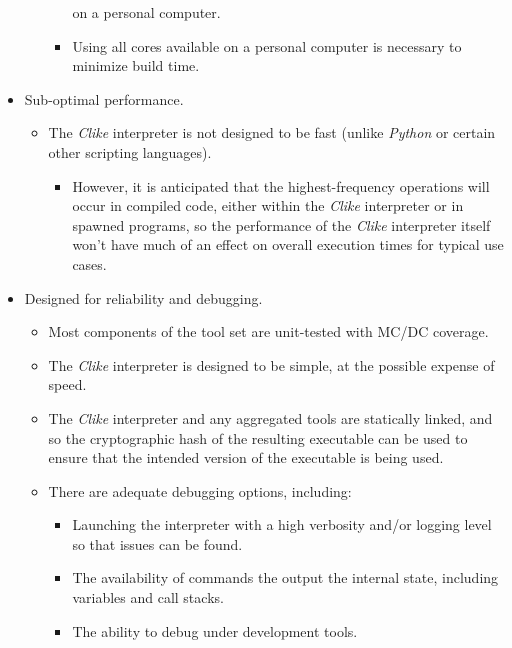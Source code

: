 \begin{itemize}
\begin{itemize}
\begin{itemize}
                        on a personal computer.
                  \item Using all cores available on a personal computer is necessary to minimize
                        build time.
               \end{itemize}
      \end{itemize}
   \item Sub-optimal performance.
      \begin{itemize}
         \item The \emph{Clike} interpreter is not designed to be fast (unlike \emph{Python} or
               certain other scripting languages).
               \begin{itemize}
                  \item However, it is anticipated that the highest-frequency operations will occur
                        in compiled code, either within the \emph{Clike} interpreter or in spawned
                        programs, so the performance of the \emph{Clike} interpreter itself
                        won't have much of an effect on overall execution times for typical
                        use cases.
               \end{itemize}
      \end{itemize}
   \item Designed for reliability and debugging.
      \begin{itemize}
         \item Most components of the tool set are unit-tested with MC/DC coverage.
         \item The \emph{Clike} interpreter is designed to be simple, at the possible
               expense of speed.
         \item The \emph{Clike} interpreter and any aggregated tools are statically linked, and so the
               cryptographic hash of the resulting executable can be used to ensure that the intended
               version of the executable is being used.
         \item There are adequate debugging options, including:
               \begin{itemize}
                  \item Launching the interpreter with a high verbosity and/or logging level so that
                        issues can be found.
                  \item The availability of commands the output the internal state, including variables
                        and call stacks.
                  \item The ability to debug under development tools.
               \end{itemize}
      \end{itemize}
\end{itemize}


